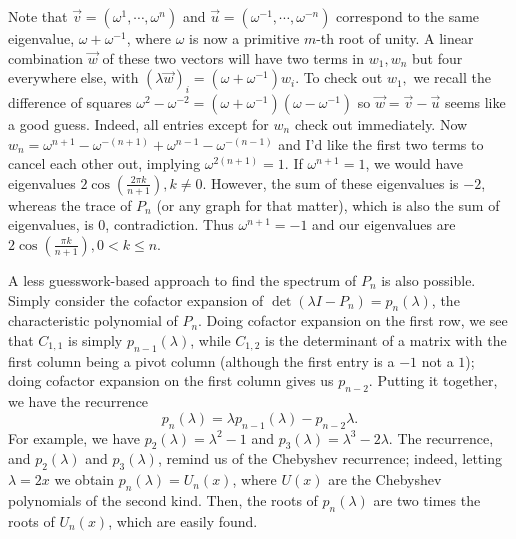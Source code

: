\begin{solution}
    Note that $\vec v = \left(\omega^1, \cdots , \omega^{n}\right)$ and 
    $\vec u = \left(\omega^{-1}, \cdots , \omega^{-n}\right)$ correspond to the 
    same eigenvalue, $\omega + \omega^{-1}$, where $\omega$ is now a primitive $m$-th root of unity. 
    A linear combination $\vec w$ of these two vectors will have two terms in $w_1, w_n$ but four 
    everywhere else, with $\left(\lambda\vec w\right)_i = \left(\omega + \omega^{-1}\right)w_i$. 
    To check out $w_1,$ we recall the difference of squares $\omega^2 - \omega^{-2} = \left(\omega + \omega^{-1}\right)\left(\omega - \omega^{-1}\right)$ 
    so $\vec w = \vec v - \vec u$ seems like a good guess. Indeed, all entries except for $w_n$ check out immediately. 
    Now $w_n = \omega^{n + 1} - \omega^{-(n + 1)} + \omega^{n - 1} - \omega^{-(n - 1)}$ and I'd like the first 
    two terms to cancel each other out, implying $\omega^{2(n + 1)} = 1$. If $\omega^{n + 1} = 1$, 
    we would have eigenvalues $2\cos\left(\frac{2\pi k}{n + 1}\right), k \neq 0$. However, 
    the sum of these eigenvalues is $-2$, whereas the trace of $P_n$ (or any graph for that matter), 
    which is also the sum of eigenvalues, is $0$, contradiction. Thus $\omega^{n + 1} = -1$ 
    and our eigenvalues are $2\cos\left(\frac{\pi k}{n + 1}\right), 0 < k \leq n$. \medskip

    A less guesswork-based approach to find the spectrum of $P_n$ is also possible. Simply 
    consider the cofactor expansion of $\det\left(\lambda I - P_n\right) = p_n(\lambda)$, 
    the characteristic polynomial of $P_n$. Doing cofactor expansion on the first row, we see 
    that $C_{1, 1}$ is simply $p_{n - 1}(\lambda)$, while $C_{1, 2}$ is the determinant of a 
    matrix with the first column being a pivot column (although the first entry is a $-1$ not a $1$); 
    doing cofactor expansion on the first column gives us $p_{n - 2}$. Putting it together, we 
    have the recurrence $$p_n(\lambda) = \lambda p_{n - 1}(\lambda) - p_{n - 2}\lambda.$$ For 
    example, we have $p_2(\lambda) = \lambda^2 - 1$ and $p_3(\lambda) = \lambda^3 - 2\lambda$. 
    The recurrence, and $p_2(\lambda)$ and $p_3(\lambda)$, remind us of the Chebyshev recurrence; 
    indeed, letting $\lambda = 2x$ we obtain $p_n(\lambda) = U_n(x)$, where $U(x)$ are the 
    Chebyshev polynomials of the second kind. Then, the roots of $p_n(\lambda)$ are two times the roots 
    of $U_n(x)$, which are easily found. 
\end{solution}\bigskip
